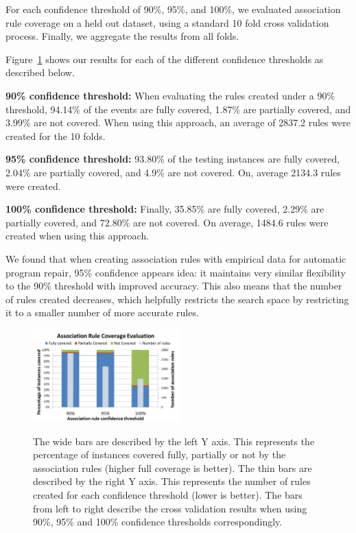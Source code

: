 \documentclass[sigconf]{acmart}
\begin{document}
For each confidence
threshold of 90\%, 95\%, and 100\%, we evaluated association rule coverage on a held out
dataset, using 
a standard 10 fold cross validation process. Finally, we aggregate the results
from all folds.

Figure~\ref{ruleEvaluation} shows our results for each of the 
different confidence thresholds as described below.

\vspace{1em}
\noindent\textbf{90\% confidence threshold:}
When evaluating the rules created under a 90\% threshold, 94.14\% of the 
events are fully covered, 1.87\% are partially covered, and 3.99\% are
not covered. When using this approach, an average of 2837.2 rules were
created for the 10 folds.

\vspace{1em}
\noindent\textbf{95\% confidence threshold:}
93.80\% of the testing instances are fully covered, 2.04\% are
partially covered, and 4.9\% are not covered. On, average 2134.3 rules
were created.

\vspace{1em}
\noindent\textbf{100\% confidence threshold:}
Finally, 35.85\% are fully
covered, 2.29\% are partially covered, and 72.80\% are not covered.
On average, 1484.6 rules were created when using this approach.

\vspace{1em}
We found that when creating association
rules with empirical data for automatic program repair, 95\% confidence appears
idea: 
it maintains very similar flexibility 
to the 90\% threshold with improved accuracy.
This also means that the number of rules created decreases, which helpfully
restricts 
the search space by restricting it to a smaller number of more accurate rules.
 

\begin{figure}[h]
\caption{The wide bars are described by the left Y axis. This represents
the percentage of instances covered
fully, partially or not by the association rules (higher full coverage is better). 
The thin bars are described by the right Y axis.
This represents the number of rules created for each confidence threshold 
(lower is better).
The bars from left to right describe the cross validation
results when using 90\%, 95\% and 100\% confidence thresholds correspondingly.}
\centering
\includegraphics[width=0.5\textwidth]{images/assocRuleEval.png}
\label{ruleEvaluation}
\end{figure}
\end{document}

